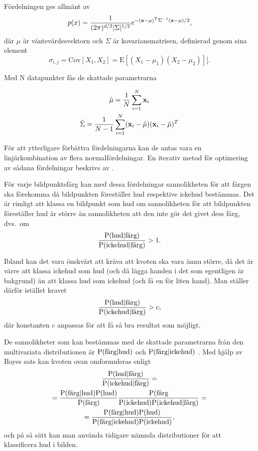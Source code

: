 \documentclass[../rapport_MVEX01-11-05]{subfiles}
\begin{document}
Fördelningen ges allmänt av
\begin{equation*}
  p(x)=\frac{1}{(2\pi)^{d/2}|\Sigma|^{1/2}}e^{-(\mathbf{x}-\mu)^T\Sigma^{-1}(\mathbf{x}-\mu)/2},
\end{equation*}
där $\mu$ är väntevärdesvektorn och $\Sigma$ är kovariansmatrisen, definierad
genom sina element
\begin{equation*}
 \sigma_{i,j}=\text{Cov}[X_1,X_2]=\text{E}[(X_1-\mu_1)(X_2-\mu_2)]].
\end{equation*}

Med N datapunkter fås de skattade parametrarna

\begin{gather*}
  \hat\mu    =\frac{1}{N}\sum_{i=1}^N\mathbf{x}_i\\
  \hat\Sigma =\frac{1}{N-1}\sum_{i=1}^N(\mathbf{x}_i-\hat\mu)(\mathbf{x}_i-\hat\mu)^T
\end{gather*}

För att ytterligare förbättra fördelningarna kan de antas vara
en linjärkombination av flera normalfördelningar. En iterativ metod för optimering av
sådana fördelningar beskrivs av .

För varje bildpunktsfärg kan med dessa fördelningar sannolikheten för att färgen ska
förekomma då bildpunkten föreställer hud
respektive ickehud bestämmas. Det är rimligt att klassa en bildpunkt som
hud om sannolikheten för att bildpunkten föreställer hud är större än
sannolikheten att den inte gör det givet dess färg, dvs.~om
\begin{equation*}
	\frac{\mathrm{P}(\textrm{hud}|\textrm{färg})}{\mathrm{P}(\textrm{ickehud}|\textrm{färg})} > 1.
\end{equation*}

Ibland kan det vara önskvärt att kräva att kvoten ska vara ännu
större, då det är värre att klassa ickehud som hud (och då lägga
handen i det som egentligen är bakgrund) än att klassa hud som ickehud
(och få en för liten hand). Man ställer därför istället kravet 
\begin{equation*}
	\frac{\mathrm{P}(\textrm{hud}|\textrm{färg})}{\mathrm{P}(\textrm{ickehud}|\textrm{färg})} > c,
\end{equation*}
där konstanten $c$ anpassas för att få så bra resultat som möjligt.

De sannolikheter som kan bestämmas med de skattade parametrarna från den
multivariata distributionen är
$\mathrm{P}(\textrm{färg}|\textrm{hud})$ och
$\mathrm{P}(\textrm{färg}|\textrm{ickehud})$ . Med hjälp av Bayes sats
kan kvoten ovan omformuleras enligt
\begin{multline*}
\frac{\mathrm{P}(\textrm{hud}|\textrm{färg})}{\mathrm{P}(\textrm{ickehud}|\textrm{färg})}=\\
=\frac{\mathrm{P}(\textrm{färg}|\textrm{hud})\mathrm{P}(\textrm{hud})}{\mathrm{P}(\textrm{färg})}
 \frac{\mathrm{P}(\textrm{färg}}{\mathrm{P}(\textrm{ickehud})\mathrm{P}(\textrm{ickehud}|\textrm{färg})}=\\
=\frac{\mathrm{P}(\textrm{färg}|\textrm{hud})\mathrm{P}(\textrm{hud})}{\mathrm{P}(\textrm{färg}|\textrm{ickehud})
 \mathrm{P}(\textrm{ickehud})},
\end{multline*}
och på så sätt kan man använda tidigare nämnda distributioner för att
klassificera hud i bilden. 
\end{document}
